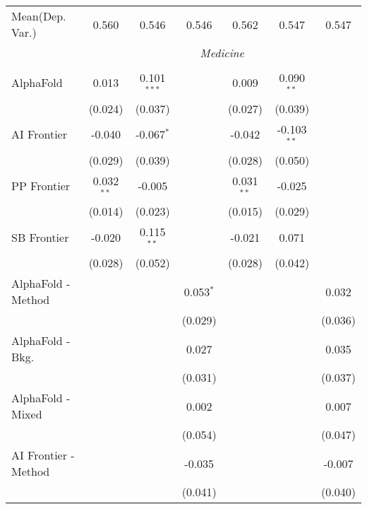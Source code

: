 \begin{tabular}{lcccccc}
Mean(Dep. Var.) & 0.560 & 0.546 & 0.546 & 0.562 & 0.547 & 0.547 \\
 & \multicolumn{6}{c}{\textit{Medicine}} \\ \\
   AlphaFold            & 0.013        & 0.101$^{***}$ &             & 0.009        & 0.090$^{**}$  &   \\   
                        & (0.024)      & (0.037)       &             & (0.027)      & (0.039)       &   \\   
   AI Frontier          & -0.040       & -0.067$^{*}$  &             & -0.042       & -0.103$^{**}$ &   \\   
                        & (0.029)      & (0.039)       &             & (0.028)      & (0.050)       &   \\   
   PP Frontier          & 0.032$^{**}$ & -0.005        &             & 0.031$^{**}$ & -0.025        &   \\   
                        & (0.014)      & (0.023)       &             & (0.015)      & (0.029)       &   \\   
   SB Frontier          & -0.020       & 0.115$^{**}$  &             & -0.021       & 0.071         &   \\   
                        & (0.028)      & (0.052)       &             & (0.028)      & (0.042)       &   \\   
   AlphaFold - Method   &              &               & 0.053$^{*}$ &              &               & 0.032\\   
                        &              &               & (0.029)     &              &               & (0.036)\\   
   AlphaFold - Bkg.     &              &               & 0.027       &              &               & 0.035\\   
                        &              &               & (0.031)     &              &               & (0.037)\\   
   AlphaFold - Mixed    &              &               & 0.002       &              &               & 0.007\\   
                        &              &               & (0.054)     &              &               & (0.047)\\   
   AI Frontier - Method &              &               & -0.035      &              &               & -0.007\\   
                        &              &               & (0.041)     &              &               & (0.040)\\   

\end{tabular}
